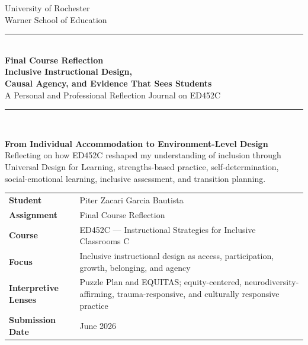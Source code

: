 \documentclass[11pt]{article}
\begin{document}
\begin{titlepage}
\thispagestyle{empty}

\begin{center}
{\large University of Rochester\\}
{\normalsize Warner School of Education\\[0.15in]}

{\color{PrimaryRed}\rule{\textwidth}{1.4pt}}\\[0.12in]
{\Huge\bfseries Final Course Reflection\\[0.08in]
\huge Inclusive Instructional Design,\\[0.08in]
Causal Agency, and Evidence That Sees Students}\\[0.18in]
{\Large A Personal and Professional Reflection Journal on ED452C}\\[0.12in]

\vfill

{\color{PrimaryRed}\rule{0.78\textwidth}{0.7pt}}\\[0.22in]

\colorbox{SoftBlue}{%
\parbox{0.88\textwidth}{%
\centering\small\vspace{0.02in}
\textbf{From Individual Accommodation to Environment-Level Design}\\[0.05in]
Reflecting on how ED452C reshaped my understanding of inclusion through Universal Design for Learning, strengths-based practice, self-determination, social-emotional learning, inclusive assessment, and transition planning.
}%
}
\end{center}

\vfill

\begin{center}
\renewcommand{\arraystretch}{1.18}
\setlength{\tabcolsep}{4pt}
\begin{tabular}{>{\bfseries\RaggedLeft}p{1.7in} p{5.35in}}
Student & Piter Zacari Garcia Bautista \\
Assignment & Final Course Reflection \\
Course & ED452C --- Instructional Strategies for Inclusive Classrooms C \\
Focus & Inclusive instructional design as access, participation, growth, belonging, and agency \\
Interpretive Lenses & Puzzle Plan and EQUITAS; equity-centered, neurodiversity-affirming, trauma-responsive, and culturally responsive practice \\
Submission Date & June 2026 \\
\end{tabular}
\end{center}


\end{titlepage}
\end{document}
